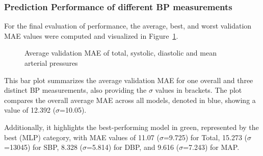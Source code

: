 \newpage

\subsubsection{Prediction Performance of different BP measurements}
\label{subsubsec:bp_prediction_performance}

For the final evaluation of performance, the average, best, and worst validation MAE values were computed and visualized in Figure~\ref{fig:all_mae}.

\begin{figure}[h]
    \centering
    \captionsetup{format=plain, justification=centering, font=small}
    \caption{Average validation MAE of total, systolic, diastolic and mean arterial pressures}
    \label{fig:all_mae}
\end{figure}

This bar plot summarizes the average validation MAE for one overall and three distinct BP measurements, also providing the $\sigma$ values in brackets.
The plot compares the overall average MAE across all models, denoted in blue, showing a value of 12.392 ($\sigma$=10.05).

Additionally, it highlights the best-performing model in green, represented by the best (MLP) category, with MAE values of 11.07 ($\sigma$=9.725) for Total,
15.273 ($\sigma$=13045) for SBP, 8.328 ($\sigma$=5.814) for DBP, and 9.616 ($\sigma$=7.243) for MAP\@.

